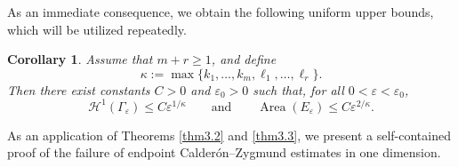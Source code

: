\documentclass[12pt,twoside]{amsart}
\numberwithin{equation}{section}
\newtheorem{theorem}{Theorem}[section]
\newtheorem{corollary}[theorem]{Corollary}
\numberwithin{definition}{section} %
\begin{document}
As an immediate consequence, we obtain the following uniform upper bounds, which will be utilized repeatedly.

\begin{corollary}\label{c01}
Assume that $m+r \ge 1$, and define
\[
\kappa := \max\{ k_1, \dots, k_m, \ell_1, \dots, \ell_r \}.
\]
Then there exist constants $C > 0$ and $\varepsilon_0 > 0$ such that, for all $0 < \varepsilon < \varepsilon_0$,
\[
\mathcal{H}^1(\Gamma_\varepsilon) \le C \varepsilon^{1/\kappa}
\qquad \text{and} \qquad
\operatorname{Area}(E_\varepsilon) \le C \varepsilon^{2/\kappa}.
\]
\end{corollary}

As an application of Theorems \ref{thm3.2} and \ref{thm3.3}, we present a self-contained proof of the failure of endpoint Calder\'on--Zygmund estimates in one dimension.





 
\end{document}
